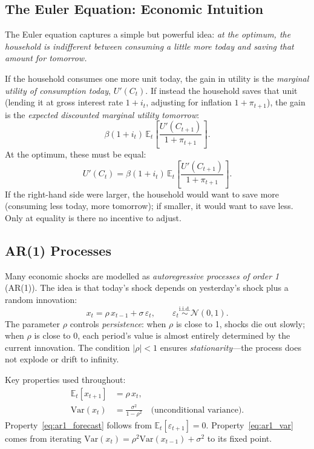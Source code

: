 \documentclass[11pt,a4paper]{article}
\theoremstyle{definition}
\newcommand{\E}{\mathbb{E}}
\newcommand{\Var}{\mathrm{Var}}
\begin{document}
	\subsection{The Euler Equation: Economic Intuition}
	
	The Euler equation captures a simple but powerful idea: \emph{at the optimum, the household is indifferent between consuming a little more today and saving that amount for tomorrow.}
	
	If the household consumes one more unit today, the gain in utility is the \emph{marginal utility of consumption today}, $U'(C_t)$.
	If instead the household saves that unit (lending it at gross interest rate $1 + i_t$, adjusting for inflation $1 + \pi_{t+1}$), the gain is the \emph{expected discounted marginal utility tomorrow}:
	\begin{equation}
		\beta(1+i_t) \, \E_t\!\left[\frac{U'(C_{t+1})}{1+\pi_{t+1}}\right].
	\end{equation}
	At the optimum, these must be equal:
	\begin{equation}\label{eq:euler_intuition}
		U'(C_t) = \beta(1+i_t) \, \E_t\!\left[\frac{U'(C_{t+1})}{1+\pi_{t+1}}\right].
	\end{equation}
	If the right-hand side were larger, the household would want to save more (consuming less today, more tomorrow); if smaller, it would want to save less.
	Only at equality is there no incentive to adjust.
	
	\subsection{AR(1) Processes}
	\label{sec:ar1}
	
	Many economic shocks are modelled as \emph{autoregressive processes of order 1} (AR(1)).
	The idea is that today's shock depends on yesterday's shock plus a random innovation:
	\begin{equation}\label{eq:ar1_def}
		x_t = \rho \, x_{t-1} + \sigma \, \varepsilon_t, \qquad \varepsilon_t \overset{\text{i.i.d.}}{\sim} \mathcal{N}(0, 1).
	\end{equation}
	The parameter $\rho$ controls \emph{persistence}: when $\rho$ is close to 1, shocks die out slowly; when $\rho$ is close to 0, each period's value is almost entirely determined by the current innovation.
	The condition $|\rho| < 1$ ensures \emph{stationarity}---the process does not explode or drift to infinity.
	
	Key properties used throughout:
	\begin{align}
		\E_t[x_{t+1}] &= \rho \, x_t, \label{eq:ar1_forecast}\\
		\Var(x_t) &= \frac{\sigma^2}{1 - \rho^2} \quad \text{(unconditional variance)}. \label{eq:ar1_var}
	\end{align}
	Property~\eqref{eq:ar1_forecast} follows from $\E_t[\varepsilon_{t+1}] = 0$.
	Property~\eqref{eq:ar1_var} comes from iterating $\Var(x_t) = \rho^2 \Var(x_{t-1}) + \sigma^2$ to its fixed point.
	
\end{document}
